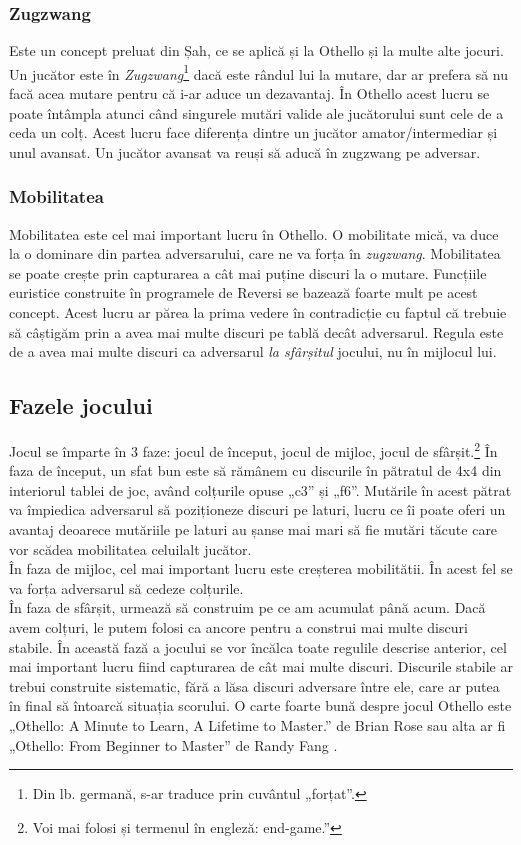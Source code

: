 \documentclass[12pt,twoside,a4paper,fleqn]{book}
\theoremstyle{definition}
\begin{document}
\subsubsection{Zugzwang}
Este un concept preluat din Șah, ce se aplică și la Othello și la multe alte jocuri. Un jucător este în \emph{Zugzwang}\footnote{Din lb. germană, s-ar traduce prin cuvântul „forțat”.} dacă este rândul lui la mutare, dar ar prefera să nu facă acea mutare pentru că i-ar aduce un dezavantaj. În Othello acest lucru se poate întâmpla atunci când singurele mutări valide ale jucătorului sunt cele de a ceda un colț. Acest lucru face diferența dintre un jucător amator/intermediar și unul avansat. Un jucător avansat va reuși să aducă în zugzwang pe adversar.
\subsubsection{Mobilitatea}
\label{mobility}
Mobilitatea este cel mai important lucru în Othello. O mobilitate mică, va duce la o dominare din partea adversarului, care ne va forța în \emph{zugzwang}. Mobilitatea se poate crește prin capturarea a cât mai puține discuri la o mutare. Funcțiile euristice construite în programele de Reversi se bazează foarte mult pe acest concept. Acest lucru ar părea la prima vedere în contradicție cu faptul că trebuie să câștigăm prin a avea mai multe discuri pe tablă decât adversarul. Regula este de a avea mai multe discuri ca adversarul \emph{la sfârșitul} jocului, nu în mijlocul lui.
\subsection{Fazele jocului}
Jocul se împarte în $3$ faze: jocul de început, jocul de mijloc, jocul de sfârșit.\footnote{Voi mai folosi și termenul în engleză: end-game.”} În faza de început, un sfat bun \cite{othello_fang} este să rămânem cu discurile în pătratul de 4x4 din interiorul tablei de joc, având colțurile opuse „c3” și „f6”. Mutările în acest pătrat va împiedica adversarul să poziționeze discuri pe laturi, lucru ce îi poate oferi un avantaj deoarece mutăriile pe laturi au șanse mai mari să fie mutări tăcute care vor scădea mobilitatea celuilalt jucător.\\
În faza de mijloc, cel mai important lucru este creșterea mobilitătii. În acest fel se va forța adversarul să cedeze colțurile.\\
În faza de sfârșit, urmează să construim pe ce am acumulat până acum. Dacă avem colțuri, le putem folosi ca ancore pentru a construi mai multe discuri stabile. În această fază a jocului se vor încălca toate regulile descrise anterior, cel mai important lucru fiind capturarea de cât mai multe discuri. Discurile stabile ar trebui construite sistematic, fără a lăsa discuri adversare între ele, care ar putea în final să întoarcă situația scorului. O carte foarte bună despre jocul Othello este „Othello: A Minute to Learn, A Lifetime to Master.” de Brian Rose \cite{othello_master} sau alta ar fi „Othello: From Beginner to Master” de Randy Fang \cite{othello_fang}.
\end{document}
